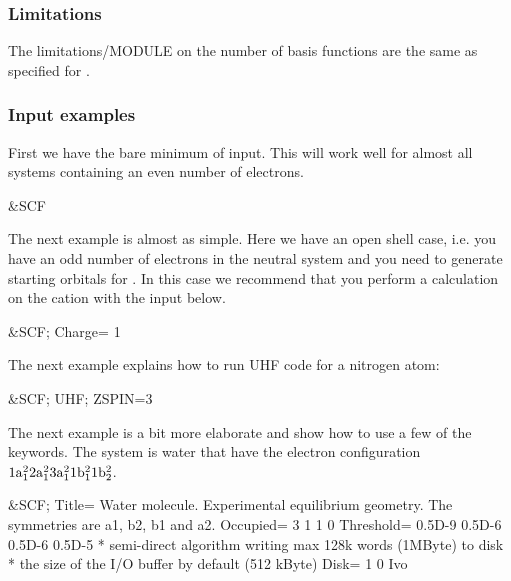 \subsubsection{Limitations}
The limitations/MODULE on the number of basis functions are the same as specified
for .

\subsubsection{Input examples}

First we have the bare minimum of input. This will work well for almost
all systems containing an even number of electrons.

\begin{inputlisting}
 &SCF
\end{inputlisting}

The next example is almost as simple. Here we have an open shell case,
i.e. you have an odd number of electrons in the neutral system and you
need to generate starting orbitals for .
In this case we recommend that you perform a calculation on the
cation with the input below.

\begin{inputlisting}
 &SCF; Charge= 1
\end{inputlisting}

The next example explains how to run UHF code for a nitrogen atom:
\begin{inputlisting}
 &SCF; UHF; ZSPIN=3
\end{inputlisting}

The next example is a bit more elaborate and show how to use
a few of the keywords. The system is water that have the
electron configuration $\rm 1a_1^2 2a_1^2 3a_1^2 1b_1^2 1b_2^2$.

\begin{inputlisting}
 &SCF; Title= Water molecule. Experimental equilibrium geometry. The symmetries are a1, b2, b1 and a2.
Occupied= 3 1 1 0
Threshold= 0.5D-9 0.5D-6 0.5D-6 0.5D-5
* semi-direct algorithm writing max 128k words (1MByte) to disk
* the size of the I/O buffer by default (512 kByte)
Disk= 1 0
Ivo
\end{inputlisting}
